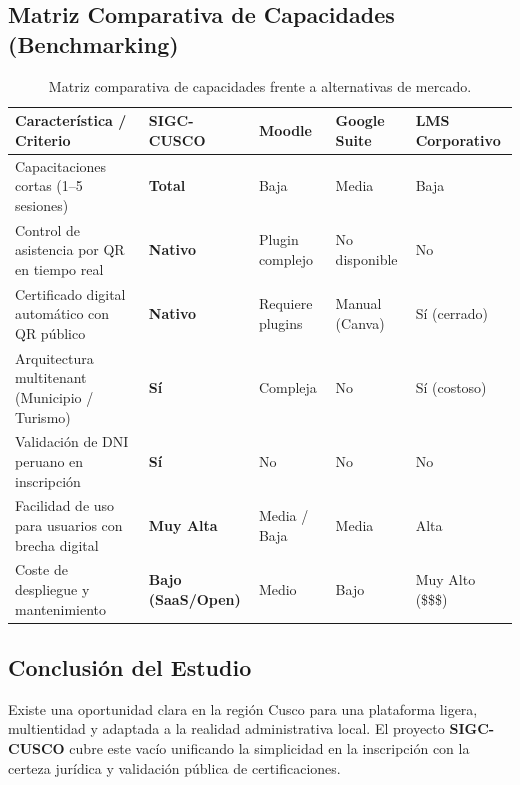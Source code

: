 \subsection{Matriz Comparativa de Capacidades (Benchmarking)}

\begin{table}[H]
\centering
\small
\renewcommand{\arraystretch}{1.2}
\begin{tabularx}{\textwidth}{P{4.6cm}YYYY}
\toprule
\textbf{Característica / Criterio} & \textbf{SIGC-CUSCO} & \textbf{Moodle} & \textbf{Google Suite} & \textbf{LMS Corporativo} \\
\midrule
Capacitaciones cortas (1--5 sesiones) & \textbf{Total} & Baja & Media & Baja \\
Control de asistencia por QR en tiempo real & \textbf{Nativo} & Plugin complejo & No disponible & No \\
Certificado digital automático con QR público & \textbf{Nativo} & Requiere plugins & Manual (Canva) & Sí (cerrado) \\
Arquitectura multitenant (Municipio / Turismo) & \textbf{Sí} & Compleja & No & Sí (costoso) \\
Validación de DNI peruano en inscripción & \textbf{Sí} & No & No & No \\
Facilidad de uso para usuarios con brecha digital & \textbf{Muy Alta} & Media / Baja & Media & Alta \\
Coste de despliegue y mantenimiento & \textbf{Bajo (SaaS/Open)} & Medio & Bajo & Muy Alto (\$\$\$) \\
\bottomrule
\end{tabularx}
\caption{Matriz comparativa de capacidades frente a alternativas de mercado.}
\label{tab:benchmarking}
\end{table}

\subsection{Conclusión del Estudio}
Existe una oportunidad clara en la región Cusco para una plataforma ligera, multientidad y adaptada a la realidad administrativa local. El proyecto \textbf{SIGC-CUSCO} cubre este vacío unificando la simplicidad en la inscripción con la certeza jurídica y validación pública de certificaciones.
